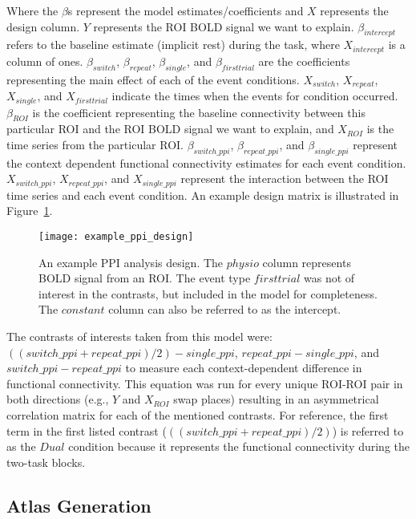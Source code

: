 \documentclass[phd,figures,tables,ackpage,abstractpage,publicabstractpage]{uithesis}
\begin{document}
Where the $\beta$s represent the model estimates/coefficients and $X$ represents
the design column.
$Y$ represents the ROI BOLD signal we want to explain.
$\beta_{intercept}$ refers to the baseline estimate (implicit rest) during the task,
where $X_{intercept}$ is a column of ones.
$\beta_{switch}$, $\beta_{repeat}$, $\beta_{single}$, and $\beta_{firsttrial}$
are the coefficients representing the main effect of each of the event conditions.
$X_{switch}$, $X_{repeat}$, $X_{single}$, and $X_{firsttrial}$ indicate the
times when the events for condition occurred.
$\beta_{ROI}$ is the coefficient representing the baseline connectivity between
this particular ROI and the ROI BOLD signal we want to explain, and
$X_{ROI}$ is the time series from the particular ROI.
$\beta_{switch\_ppi}$, $\beta_{repeat\_ppi}$, and $\beta_{single\_ppi}$
represent the context dependent functional connectivity estimates for
each event condition.
$X_{switch\_ppi}$, $X_{repeat\_ppi}$, and $X_{single\_ppi}$ represent
the interaction between the ROI time series and each event condition.
An example design matrix is illustrated in Figure~\ref{fig:example_ppi_design}.

\begin{figure}[H]
  \centering
  \texttt{[image: example\_ppi\_design]}
  \caption[An example PPI analysis design]{
    An example PPI analysis design.
    The $physio$ column represents BOLD signal from an ROI.
    The event type $firsttrial$ was not of interest in the contrasts,
    but included in the model for completeness.
    The $constant$ column can also be referred to as the intercept.
  }
  \label{fig:example_ppi_design}
\end{figure}

The contrasts of interests taken from this model were:\\
$((switch\_ppi + repeat\_ppi) / 2) - single\_ppi$, $repeat\_ppi - single\_ppi$,
and $switch\_ppi - repeat\_ppi$ to measure each context-dependent difference in functional connectivity. 
This equation was run for every unique ROI-ROI pair in both directions
(e.g., $Y$ and $X_{ROI}$ swap places) resulting in an
asymmetrical correlation matrix for each of the mentioned contrasts.
For reference, the first term in the first listed contrast ($((switch\_ppi + repeat\_ppi) / 2)$)
is referred to as the $Dual$ condition because it represents the functional connectivity during the
two-task blocks.

\subsection{Atlas Generation}
\label{methods:atlas-corr-analysis2}
\end{document}
